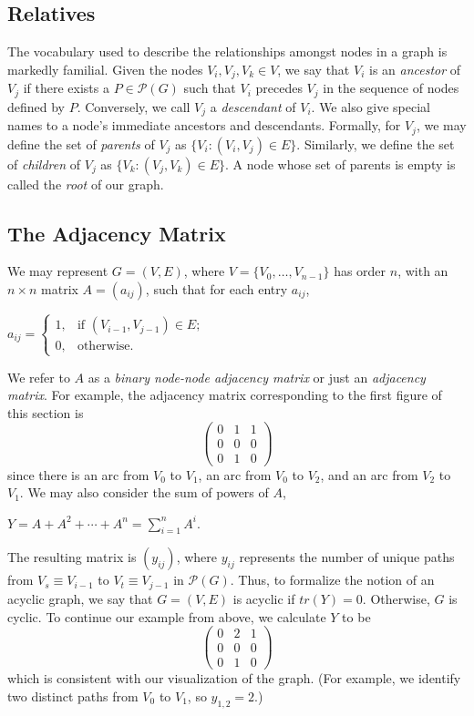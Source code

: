 \documentclass[12pt,twoside]{reedthesis}
\begin{document}
	\subsection*{Relatives}
	The vocabulary used to describe the relationships amongst nodes in a graph is markedly familial. Given the nodes $V_i, V_j, V_k \in V$, we say that $V_i$ is an {\em ancestor} of $V_j$ if there exists a $P \in \mathcal{P}(G)$ such that $V_i$ precedes $V_j$ in the sequence of nodes defined by $P$. Conversely, we call $V_j$ a {\em descendant} of $V_i$. We also give special names to a node's immediate ancestors and descendants. Formally, for $V_j$, we may define the set of {\em parents} of $V_j$ as $\{V_i : (V_i,V_j) \in E \}$. Similarly, we define the set of {\em children} of $V_j$ as $\{V_k : (V_j, V_k) \in E\}$. A node whose set of parents is empty is called the {\em root} of our graph.
	
	\subsection*{The Adjacency Matrix}
	We may represent $G=(V,E)$, where $V = \{V_0, \ldots, V_{n-1} \}$ has order $n$, with an $n \times n$ matrix $A = (a_{ij})$, such that for each entry $a_{ij}$, 
	\begin{center}
	 	$a_{ij} = 
		\begin{cases} 1, & \textrm{if\ \ \ } (V_{i-1},V_{j-1}) \in E; \\
		0, & \textrm{otherwise}. \end{cases}$
	 \end {center}
	We refer to $A$ as a {\em binary node-node adjacency matrix} or just an {\em adjacency matrix}. For example, the adjacency matrix corresponding to the first figure of this section is
	\[
	\begin{pmatrix}
	0 & 1 & 1 \\
	0 & 0 & 0 \\
	0 & 1 & 0
	\end{pmatrix} \]
	since there is an arc from $V_0$ to $V_1$, an arc from $V_0$ to $V_2$, and an arc from $V_2$ to $V_1$. We may also consider the sum of powers of $A$,
	\begin{center}
		$Y = A + A^2 + \cdots + A^n = \displaystyle\sum_{i=1}^{n} A^{i}$.
	\end{center}
	The resulting matrix is $(y_{ij})$, where $y_{ij}$ represents the number of unique paths from $V_s \equiv V_{i-1}$ to $V_t \equiv V_{j-1}$ in $\mathcal P(G)$. 
	Thus, to formalize the notion of an acyclic graph, we say that $G=(V,E)$ is acyclic if $tr(Y) = 0$. 
	Otherwise, $G$ is cyclic.
	To continue our example from above, we calculate $Y$ to be
	\[
	\begin{pmatrix}
	0 & 2 & 1 \\
	0 & 0 & 0 \\
	0 & 1 & 0
	\end{pmatrix} \]
	which is consistent with our visualization of the graph. 
	(For example, we identify two distinct paths from $V_0$ to $V_1$, so $y_{1,2} = 2$.)
	
\end{document}

